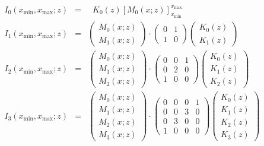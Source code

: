 \documentclass[a4paper,10pt,twosided]{article}
\begin{document}
\begin{eqnarray*}
     I_0(x_\mathrm{min},x_\mathrm{max};z) &=&  \;\; K_0(z) \left[ M_0(x;z) \right]_{x_\mathrm{min}}^{x_\mathrm{max}}
\\   I_1(x_\mathrm{min},x_\mathrm{max};z) &=&  
       \left(\begin{array}{c} M_0(x;z) \\ M_1(x;z)   \end{array}\right)
\cdot \left(\begin{array}{cc}
                   0  & 1 
               \\  1  & 0 
               \end{array}\right) 
       \left(\begin{array}{c} K_0(z) \\ K_1(z)  \end{array} \right) 
\\   I_2(x_\mathrm{min},x_\mathrm{max};z) &=&  
       \left(\begin{array}{c} M_0(x;z) \\ M_1(x;z) \\ M_2(x;z)  \end{array}\right)
\cdot \left(\begin{array}{ccc}
                   0  & 0 & 1  
               \\  0  & 2 & 0  
               \\  1  & 0 & 0  
               \end{array}\right) 
       \left(\begin{array}{c} K_0(z) \\ K_1(z) \\ K_2(z)  \end{array} \right) 
\\   I_3(x_\mathrm{min},x_\mathrm{max};z) &=&  
       \left(\begin{array}{c} M_0(x;z) \\ M_1(x;z) \\ M_2(x;z) \\ M_3(x;z) \end{array}\right)
\cdot \left(\begin{array}{cccc}
                   0  & 0 & 0  &  1
               \\  0  & 0 & 3  &  0
               \\  0  & 3 & 0  &  0
               \\  1  & 0 & 0  &  0
               \end{array}\right) 
       \left(\begin{array}{c} K_0(z) \\ K_1(z) \\ K_2(z) \\ K_3(z) \end{array} \right) 
\end{eqnarray*}
\end{document}
